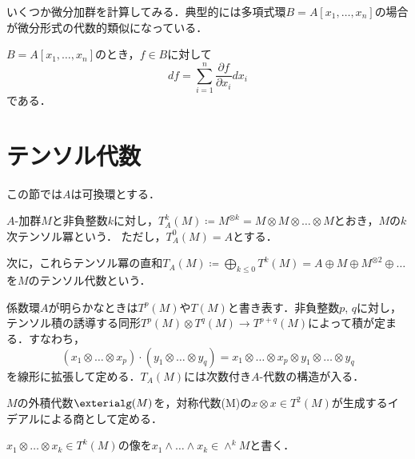 いくつか微分加群を計算してみる．典型的には多項式環\(B=A[x_1,\dots,x_n]\)の場合が微分形式の代数的類似になっている．
\begin{exam}
\(B=A[x_1,\dots,x_n]\)のとき，\(f\in B\)に対して
\[df=\sum_{i=1}^n\frac{\partial f}{\partial x_i}dx_i\]
である．
\end{exam}

\section{テンソル代数}
この節では\(A\)は可換環とする．
\begin{defi}
\(A\)-加群\(M\)と非負整数\(k\)に対し，\(T_A^k(M)\coloneqq M^{\otimes k}=M\otimes M\otimes\dots\otimes M\)とおき，\(M\)の\(k\)次テンソル冪という．
ただし，\(T_A^0(M)=A\)とする．

次に，これらテンソル冪の直和\(T_A(M)\coloneqq \bigoplus_{k\leq0}T^k(M)=A\oplus M\oplus M^{\otimes2}\oplus\dots\)を\(M\)のテンソル代数という．
\end{defi}
係数環\(A\)が明らかなときは\(T^p(M)\)や\(T(M)\)と書き表す．非負整数\(p\), \(q\)に対し，テンソル積の誘導する同形\(T^p(M)\otimes T^q(M)\to T^{p+q}(M)\)によって積が定まる．すなわち，
\[(x_1\otimes\dots\otimes x_p)\cdot(y_1\otimes\dots\otimes y_q)=x_1\otimes\dots\otimes x_p\otimes y_1\otimes\dots\otimes y_q\]
を線形に拡張して定める．\(T_A(M)\)には次数付き\(A\)-代数の構造が入る．

\begin{defi}[外積代数]
\(M\)の外積代数\(\exterialg(M)\)を，対称代数\T(M)\)の\(x\otimes x\in T^2(M)\)が生成するイデアルによる商として定める．

\(x_1\otimes\dots\otimes x_k\in T^k(M)\)の像を\(x_1\wedge\dots\wedge x_k\in \wedge^kM\)と書く．
\end{defi}
